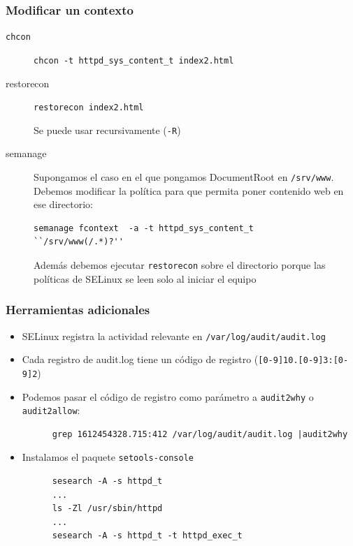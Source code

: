 \documentclass[aspectratio=169]{beamer}
\begin{document}
\begin{frame}[fragile]
  \frametitle{Modificar un contexto}
  \begin{description}
  \item[\texttt{chcon}] \texttt{chcon -t httpd\_sys\_content\_t index2.html}
  \item[restorecon] \texttt{restorecon index2.html}
    
    Se puede usar recursivamente (\texttt{-R})
  \item[semanage] 
    Supongamos el caso en el que pongamos DocumentRoot en
    \texttt{/srv/www}. Debemos modificar la política para que permita
    poner contenido web en ese directorio:
    \begin{lstlisting}[basicstyle=\scriptsize\ttfamily]
      semanage fcontext  -a -t httpd_sys_content_t   ``/srv/www(/.*)?''
    \end{lstlisting}
    Además debemos ejecutar \texttt{restorecon} sobre el directorio
    porque las políticas de SELinux se leen solo al iniciar el
    equipo
  \end{description}
\end{frame}

\begin{frame}[fragile]
  \frametitle{Herramientas adicionales}
  \begin{itemize}
  \item SELinux registra la actividad relevante en \texttt{/var/log/audit/audit.log}
  \item Cada registro de audit.log tiene un código de registro (\texttt{[0-9]{10}.[0-9]{3}:[0-9]{2}})
  \item Podemos pasar el código de registro como parámetro a \texttt{audit2why} o \texttt{audit2allow}:
    \begin{lstlisting}
      grep 1612454328.715:412 /var/log/audit/audit.log |audit2why
    \end{lstlisting}
  \item Instalamos el paquete \texttt{setools-console}
    \begin{lstlisting}
      sesearch -A -s httpd_t
      ...
      ls -Zl /usr/sbin/httpd
      ...
      sesearch -A -s httpd_t -t httpd_exec_t
    \end{lstlisting}
  \end{itemize}
\end{frame}
\end{document}
